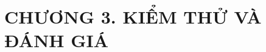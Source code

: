 \section{CHƯƠNG 3. KIỂM THỬ VÀ ĐÁNH GIÁ}
\vspace{0.5cm}
\setlength{\fboxrule}{1pt} 
\setlength{\fboxsep}{0pt}  



